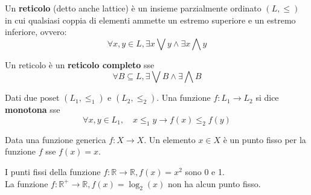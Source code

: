 \begin{defn}
    Un \textbf{reticolo} (detto anche lattice) è un insieme parzialmente ordinato $(L, \le)$ in cui
    qualsiasi coppia di elementi ammette un estremo superiore e un estremo
    inferiore, ovvero:
    \[
        \forall x, y \in L, \exists x \bigvee y \land \exists x \bigwedge y
    \]
\end{defn}

\begin{defn}
    Un reticolo è un \textbf{reticolo completo} sse
    \[
        \forall B \subseteq L, \exists \bigvee B \land \exists \bigwedge B
    \]
\end{defn}

\begin{defn}
    Dati due poset $(L_1, \le_1)$ e $(L_2, \le_2)$.
    Una funzione $f: L_1 \rightarrow L_2$ si dice \textbf{monotona} sse
    \[
        \forall x,y \in L_1, \quad x \le_1 y \rightarrow f(x) \le_2 f(y)
    \]
\end{defn}

\begin{defn}
    Data una funzione generica $f: X \rightarrow X$.
    Un elemento $x \in X$ è un punto fisso per la funzione $f$ sse $f(x) = x$.
\end{defn}

\begin{exmp}
    I punti fissi della funzione $f: \mathbb{R} \rightarrow \mathbb{R}, f(x) = x^2$
    sono 0 e 1.\\
    La funzione $f: \mathbb{R}^+ \rightarrow \mathbb{R}, f(x) = \log_2(x)$
    non ha alcun punto fisso.
\end{exmp}

